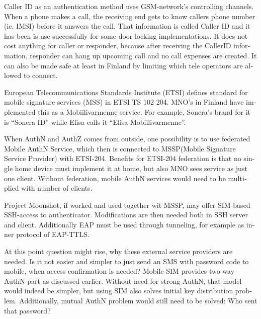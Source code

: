 \documentclass[12pt,a4paper,english]{tutthesis}
\begin{document}
\begin{otherlanguage}{english}
Caller ID as an authentication method uses GSM-network's controlling
channels. When a phone makes a call, the receiving end gets 
to know callers phone number (ie. IMSI) before it answers the call.
That information is called Caller ID and it has been is use
successfully for some door locking implementations. 
It does not cost anything for caller or responder,
because after receiving the CallerID  information, responder can hang
up upcoming call and no call expenses are created.
 It can also be made safe at least in Finland
by limiting which tele operators are allowed to connect.
















European Telecommunications Standards Institute (ETSI) defines
standard for mobile signature services (MSS) in ETSI TS 102 204.
MNO's in Finland have implemented this as a Mobiilivarmenne
service. 
For example, Sonera's brand for  it is ``Sonera ID'' while Elisa calls it
``Elisa Mobiilivarmenne''.

When AuthN and AuthZ comes from outside, one possibility is to use
federated Mobile AuthN Service, which then is connected to MSSP(Mobile
Signature Service Provider) with ETSI-204. Benefits for ETSI-204
federation is that no single home device must implement it at home,
but also MNO sees service as just one client.  Without federation,
mobile AuthN services would need to be multiplied with number of
clients.



Project Moonshot, if worked and used together wit MSSP, may offer
SIM-based SSH-access to authenticator. Modifications are then needed 
both in SSH server and client. Additionally EAP must be used through
tunneling, for example as inner protocol of EAP-TTLS.\cite{moonshot}

At this point question might rise, why these external service
providers are needed. Is it not easier and simpler to just send 
an SMS with password code to mobile, when access confirmation is needed?
Mobile SIM provides two-way AuthN part as discussed earlier.
Without need for strong AuthN, that model would indeed be 
simpler, but using SIM also solves initial key distribution problem.
Additionally, mutual AuthN problem would still need to be solved:
Who sent that password?




\end{otherlanguage}
\end{document}
